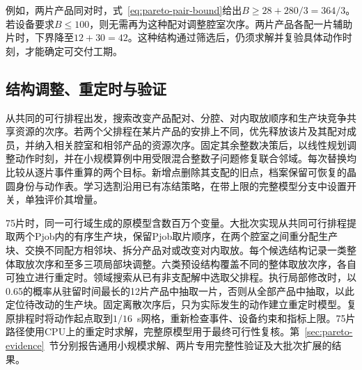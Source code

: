 例如，两片产品同对时，式~\eqref{eq:pareto-pair-bound}给出$B\ge28+280/3=364/3$。若设备要求$B\le100$，则无需再为这种配对调整腔室次序。两片产品各配一片辅助片时，下界降至$12+30=42$。这种结构通过筛选后，仍须求解并复验具体动作时刻，才能确定可交付工期。

\subsection{结构调整、重定时与验证}

从共同的可行排程出发，搜索改变产品配对、分腔、对内取放顺序和生产块竞争共享资源的次序。若两个父排程在某片产品的安排上不同，优先释放该片及其配对成员，并纳入相关腔室和相邻产品的资源次序。固定其余整数决策后，以线性规划调整动作时刻，并在小规模算例中用受限混合整数子问题修复联合邻域。每次替换均比较从逐片事件重算的两个目标。新增点删除其支配的旧点，档案保留可恢复的晶圆身份与动作表。学习选割沿用已有冻结策略，在带上限的完整模型分支中设置开关，单独评价其增量。

75片时，同一可行域生成的原模型含数百万个变量。大批次实现从共同可行排程提取两个Pjob内的有序生产块，保留Pjob取片顺序，在两个腔室之间重分配生产块、交换不同配方相邻块、拆分产品对或改变对内取放。每个候选结构记录一类整体取放次序和至多三项局部块调整。六类预设结构覆盖不同的整体取放次序，各自可独立进行重定时。领域搜索从已有非支配解中选取父排程。执行局部修改时，以0.65的概率从驻留时间最长的12片产品中抽取一片，否则从全部产品中抽取，以此定位待改动的生产块。固定离散次序后，只为实际发生的动作建立重定时模型。复原排程时将动作起点取到$1/16$~s网格，重新检查事件、设备约束和指标上限。75片路径使用CPU上的重定时求解，完整原模型用于最终可行性复核。第~\ref{sec:pareto-evidence}~节分别报告通用小规模求解、两片专用完整性验证及大批次扩展的结果。
